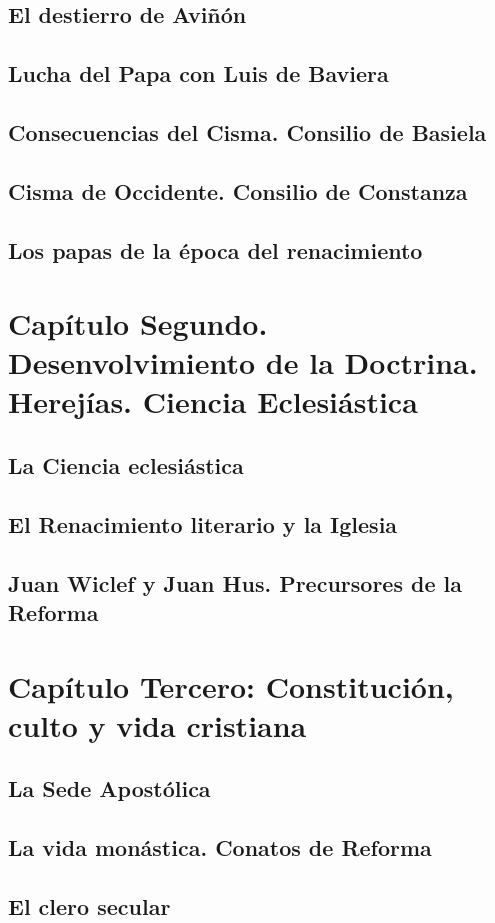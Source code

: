 \raggedbottom{} \documentclass[12pt, a4paper, openany]{book} %
\begin{document}
\section{El destierro de Aviñón}
\section{Lucha del Papa con Luis de Baviera}
\section{Consecuencias del Cisma. Consilio de Basiela}
\section{Cisma de Occidente. Consilio de Constanza}
\section{Los papas de la época del renacimiento}
\chapter{Capítulo Segundo. Desenvolvimiento de la Doctrina. Herejías. Ciencia Eclesiástica}
\section{La Ciencia eclesiástica}
\section{El Renacimiento literario y la Iglesia}
\section{Juan Wiclef y Juan Hus. Precursores de la Reforma}
\chapter{Capítulo Tercero: Constitución, culto y vida cristiana}
\section{La Sede Apostólica}
\section{La vida monástica. Conatos de Reforma}
\section{El clero secular}
\end{document}
